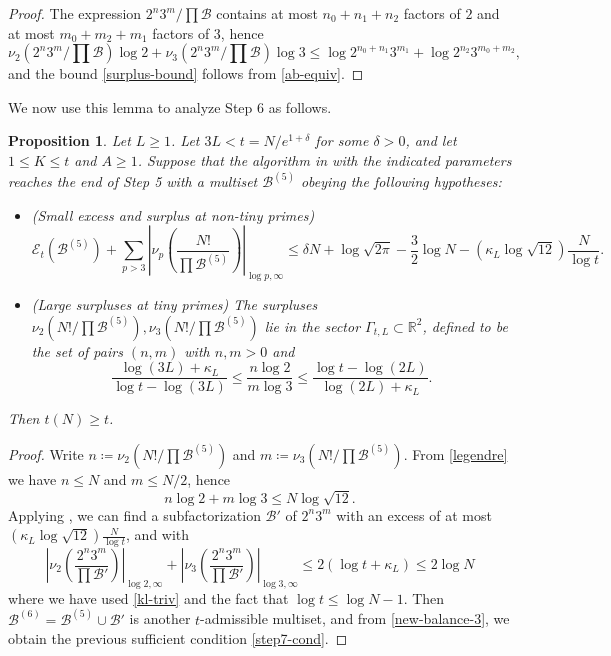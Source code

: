 \documentclass[12pt,a4paper,reqno]{amsart}
\numberwithin{equation}{section}
\theoremstyle{plain}
\newtheorem{proposition}[theorem]{Proposition}
\theoremstyle{definition}
\newcommand\R{\mathbb{R}}
\newcommand\tuple{{\mathcal B}}
\newcommand\excess{{\mathcal{E}}}
\begin{document}
\begin{proof}
  The expression $2^n 3^m / \prod \tuple$ contains at most $n_0+n_1+n_2$ factors of $2$ and at most $m_0+m_2+m_1$ factors of $3$, hence
  $$ \nu_2(2^n 3^m / \prod \tuple) \log 2 +
  \nu_3(2^n 3^m / \prod \tuple) \log 3
  \leq \log 2^{n_0+n_1} 3^{m_1} + \log 2^{n_2} 3^{m_0+m_2},$$
  and the bound \eqref{surplus-bound} follows from \eqref{ab-equiv}.
  \end{proof}
  
We now use this lemma to analyze Step 6 as follows.

\begin{proposition}\label{step6-reduce} Let $L \geq 1$.
  Let $3L < t = N/e^{1+\delta}$ for some $\delta>0$, and let $1 \leq K \leq t$ and $A \geq 1$.  Suppose that the algorithm in  with the indicated parameters reaches the end of Step 5 with a multiset $\tuple^{(5)}$ obeying the following hypotheses:
\begin{itemize}
  \item[(i)] (Small excess and surplus at non-tiny primes)
  \begin{equation}\label{new-balance-3}
    \excess_t(\tuple^{(5)}) + \sum_{p>3} \left|\nu_p\left(\frac{N!}{\prod \tuple^{(5)}}\right)\right|_{\log p,\infty} \leq \delta N + \log \sqrt{2\pi} - \frac{3}{2} \log N - (\kappa_L \log \sqrt{12}) \frac{N}{\log t}.
  \end{equation}
  \item[(ii)] (Large surpluses at tiny primes)
The surpluses $\nu_2(N!/\prod \tuple^{(5)}), \nu_3(N!/\prod \tuple^{(5)})$ lie in the sector $\Gamma_{t,L} \subset \R^2$, defined to be the set of pairs $(n,m)$ with $n,m > 0$ and
$$
\frac{\log(3L)+\kappa_L}{\log t - \log(3L)} \leq \frac{n \log 2}{m \log 3} \leq \frac{\log t - \log(2L)}{\log(2L)+\kappa_L}.
$$
\end{itemize}
Then $t(N) \geq t$.
\end{proposition}

  \begin{proof} Write $n \coloneqq \nu_2(N!/\prod \tuple^{(5)})$ and $m \coloneqq \nu_3(N!/\prod \tuple^{(5)})$.  From \eqref{legendre} we have $n \leq N$ and $m \leq N/2$, hence
    $$ n \log 2 + m \log 3 \leq N \log \sqrt{12}.$$
  Applying , we can find a subfactorization $\tuple'$ of $2^n 3^m$ with an excess of at most $(\kappa_L \log \sqrt{12}) \frac{N}{\log t}$, and with
  $$ \left|\nu_2\left(\frac{2^n 3^m}{\prod \tuple'}\right)\right|_{\log 2,\infty}
  + \left|\nu_3\left(\frac{2^n 3^m}{\prod \tuple'}\right)\right|_{\log 3,\infty}
   \leq 2(\log t + \kappa_L) \leq 2 \log N$$
   where we have used \eqref{kl-triv} and the fact that $\log t\leq \log N-1$.    Then $\tuple^{(6)} = \tuple^{(5)} \cup \tuple'$ is another $t$-admissible multiset, and from \eqref{new-balance-3}, we obtain the previous sufficient condition  \eqref{step7-cond}.
  \end{proof}
  
\end{document}
